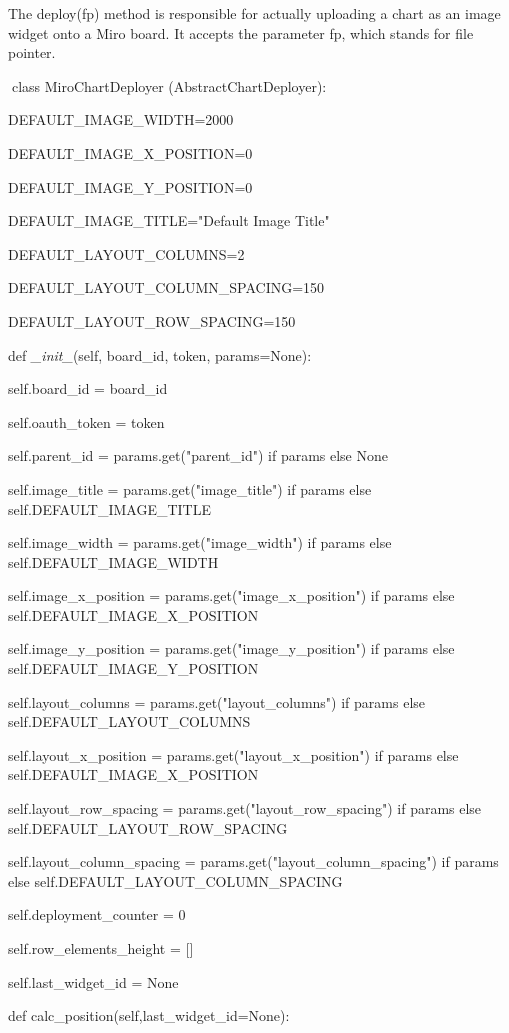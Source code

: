 \documentclass[
]{article}
\begin{document}
The deploy(fp) method is responsible for actually uploading a chart as
an image widget onto a Miro board. It accepts the parameter fp, which
stands for file pointer.

class MiroChartDeployer (AbstractChartDeployer):

DEFAULT\_IMAGE\_WIDTH=2000

DEFAULT\_IMAGE\_X\_POSITION=0

DEFAULT\_IMAGE\_Y\_POSITION=0

DEFAULT\_IMAGE\_TITLE="Default Image Title"

DEFAULT\_LAYOUT\_COLUMNS=2

DEFAULT\_LAYOUT\_COLUMN\_SPACING=150

DEFAULT\_LAYOUT\_ROW\_SPACING=150

def \emph{\_init\_}(self, board\_id, token, params=None):

self.board\_id = board\_id

self.oauth\_token = token

self.parent\_id = params.get("parent\_id") if params else None

self.image\_title = params.get("image\_title") if params else
self.DEFAULT\_IMAGE\_TITLE

self.image\_width = params.get("image\_width") if params else
self.DEFAULT\_IMAGE\_WIDTH

self.image\_x\_position = params.get("image\_x\_position") if params
else self.DEFAULT\_IMAGE\_X\_POSITION

self.image\_y\_position = params.get("image\_y\_position") if params
else self.DEFAULT\_IMAGE\_Y\_POSITION

self.layout\_columns = params.get("layout\_columns") if params else
self.DEFAULT\_LAYOUT\_COLUMNS

self.layout\_x\_position = params.get("layout\_x\_position") if params
else self.DEFAULT\_IMAGE\_X\_POSITION

self.layout\_row\_spacing = params.get("layout\_row\_spacing") if params
else self.DEFAULT\_LAYOUT\_ROW\_SPACING

self.layout\_column\_spacing = params.get("layout\_column\_spacing") if
params else self.DEFAULT\_LAYOUT\_COLUMN\_SPACING

self.deployment\_counter = 0

self.row\_elements\_height = {[}{]}

self.last\_widget\_id = None

def calc\_position(self,last\_widget\_id=None):
\end{document}
